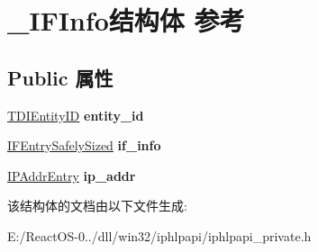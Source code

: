 \hypertarget{struct___i_f_info}{}\section{\+\_\+\+I\+F\+Info结构体 参考}
\label{struct___i_f_info}
\subsection*{Public 属性}
\begin{DoxyCompactItemize}
\item 
\mbox{\label{struct___i_f_info_a569818f2bfdb53eb0be0d8e41e2e4d30}} 
\hyperlink{struct___t_d_i_entity_i_d}{T\+D\+I\+Entity\+ID} {\bfseries entity\+\_\+id}
\item 
\mbox{\label{struct___i_f_info_a0a0059a9dd614dfa15b28ea4e3826cdf}} 
\hyperlink{union___i_f_entry_safely_sized}{I\+F\+Entry\+Safely\+Sized} {\bfseries if\+\_\+info}
\item 
\mbox{\label{struct___i_f_info_af595ee94b98294b41d49d0822e4f86c4}} 
\hyperlink{struct_i_p_addr_entry}{I\+P\+Addr\+Entry} {\bfseries ip\+\_\+addr}
\end{DoxyCompactItemize}


该结构体的文档由以下文件生成\+:\begin{DoxyCompactItemize}
\item 
E\+:/\+React\+O\+S-\/0../dll/win32/iphlpapi/iphlpapi\+\_\+private.\+h\end{DoxyCompactItemize}
